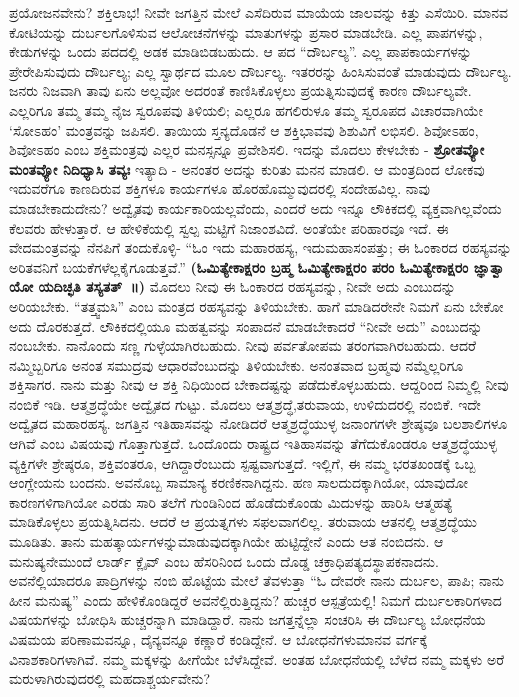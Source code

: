 ಪ್ರಯೋಜನವೇನು? ಶಕ್ತಿಲಾಭ! ನೀವೇ ಜಗತ್ತಿನ ಮೇಲೆ ಎಸೆದಿರುವ ಮಾಯೆಯ ಜಾಲವನ್ನು ಕಿತ್ತು ಎಸೆಯಿರಿ. ಮಾನವ ಕೋಟಿಯನ್ನು ದುರ್ಬಲಗೊಳಿಸುವ ಆಲೋಚನೆಗಳನ್ನು ಮಾತುಗಳನ್ನು ಪ್ರಸಾರ ಮಾಡಬೇಡಿ. ಎಲ್ಲ ಪಾಪಗಳನ್ನು, ಕೇಡುಗಳನ್ನು ಒಂದು ಪದದಲ್ಲಿ ಅಡಕ ಮಾಡಿಬಿಡಬಹುದು. ಆ ಪದ “ದೌರ್ಬಲ್ಯ”. ಎಲ್ಲ ಪಾಪಕಾರ್ಯಗಳನ್ನು ಪ್ರೇರೇಪಿಸುವುದು ದೌರ್ಬಲ್ಯ; ಎಲ್ಲ ಸ್ವಾರ್ಥದ ಮೂಲ ದೌರ್ಬಲ್ಯ. ಇತರರನ್ನು ಹಿಂಸಿಸುವಂತೆ ಮಾಡುವುದು ದೌರ್ಬಲ್ಯ. ಜನರು ನಿಜವಾಗಿ ತಾವು ಏನು ಅಲ್ಲವೋ ಅದರಂತೆ ಕಾಣಿಸಿಕೊಳ್ಳಲು ಪ್ರಯತ್ನಿಸುವುದಕ್ಕೆ ಕಾರಣ ದೌರ್ಬಲ್ಯವೇ. ಎಲ್ಲರಿಗೂ ತಮ್ಮ ತಮ್ಮ ನೈಜ ಸ್ವರೂಪವು ತಿಳಿಯಲಿ; ಎಲ್ಲರೂ ಹಗಲಿರುಳೂ ತಮ್ಮ ಸ್ವರೂಪದ ವಿಚಾರವಾಗಿಯೇ ‘ಸೋಽಹಂ’ ಮಂತ್ರವನ್ನು ಜಪಿಸಲಿ. ತಾಯಿಯ ಸ್ತನ್ಯದೊಡನೆ ಆ ಶಕ್ತಿಭಾವವು ಶಿಶುವಿಗೆ ಲಭಿಸಲಿ. ಶಿವೋಽಹಂ, ಶಿವೋಽಹಂ ಎಂಬ ಶಕ್ತಿಮಂತ್ರವು ಎಲ್ಲರ ಮನಸ್ಸನ್ನೂ ಪ್ರವೇಶಿಸಲಿ. ಇದನ್ನು ಮೊದಲು ಕೇಳಬೇಕು - \textbf{ಶ್ರೋತವ್ಯೋ ಮಂತವ್ಯೋ ನಿದಿಧ್ಯಾಸಿ ತವ್ಯಃ} ಇತ್ಯಾದಿ - ಅನಂತರ ಅದನ್ನು ಕುರಿತು ಮನನ ಮಾಡಲಿ. ಆ ಮಂತ್ರದಿಂದ ಲೋಕವು ಇದುವರೆಗೂ ಕಾಣದಿರುವ ಶಕ್ತಿಗಳೂ ಕಾರ್ಯಗಳೂ ಹೊರಹೊಮ್ಮುವುದರಲ್ಲಿ ಸಂದೇಹವಿಲ್ಲ. ನಾವು ಮಾಡಬೇಕಾದುದೇನು? ಅದ್ವೈತವು ಕಾರ್ಯಕಾರಿಯಲ್ಲವೆಂದು, ಎಂದರೆ ಅದು ಇನ್ನೂ ಲೌಕಿಕದಲ್ಲಿ ವ್ಯಕ್ತವಾಗಿಲ್ಲವೆಂದು ಕೆಲವರು ಹೇಳುತ್ತಾರೆ. ಆ ಹೇಳಿಕೆಯಲ್ಲಿ ಸ್ವಲ್ಪ ಮಟ್ಟಿಗೆ ನಿಜಾಂಶವಿದೆ. ಅಂತೆಯೇ ಪರಿಹಾರವೂ ಇದೆ. ಈ ವೇದಮಂತ್ರವನ್ನು ನೆನಪಿಗೆ ತಂದುಕೊಳ್ಳಿ- “ಓಂ ಇದು ಮಹಾರಹಸ್ಯ, ಇದು\break ಮಹಾಸಂಪತ್ತು; ಈ ಓಂಕಾರದ ರಹಸ್ಯವನ್ನು ಅರಿತವನಿಗೆ ಬಯಕೆಗಳೆಲ್ಲ\break ಕೈಗೂಡುತ್ತವೆ.” \textbf{(ಓಮಿತ್ಯೇಕಾಕ್ಷರಂ ಬ್ರಹ್ಮ ಓಮಿತ್ಯೇಕಾಕ್ಷರಂ ಪರಂ ಓಮಿತ್ಯೇ\-ಕಾಕ್ಷರಂ ಜ್ಞಾತ್ವಾ ಯೋ ಯದಿಚ್ಛತಿ ತಸ್ಯತತ್​~॥)} ಮೊದಲು ನೀವು ಈ ಓಂಕಾರದ ರಹಸ್ಯವನ್ನು, ನೀವೇ ಅದು ಎಂಬುದನ್ನು ಅರಿಯಬೇಕು. “ತತ್ತ್ವಮಸಿ” ಎಂಬ ಮಂತ್ರದ ರಹಸ್ಯವನ್ನು ತಿಳಿಯಬೇಕು. ಹಾಗೆ ಮಾಡಿದರೇನೇ ನಿಮಗೆ ಏನು ಬೇಕೋ ಅದು ದೊರಕುತ್ತದೆ. ಲೌಕಿಕದಲ್ಲಿಯೂ ಮಹತ್ವವನ್ನು ಸಂಪಾದನೆ ಮಾಡಬೇಕಾದರೆ “ನೀವೇ ಅದು” ಎಂಬುದನ್ನು ನಂಬಬೇಕು. ನಾನೊಂದು ಸಣ್ಣ ಗುಳ್ಳೆಯಾಗಿರಬಹುದು. ನೀವು ಪರ್ವತೋಪಮ ತರಂಗವಾಗಿರಬಹುದು. ಆದರೆ ನಮ್ಮಿಬ್ಬರಿಗೂ ಅನಂತ ಸಮುದ್ರವು ಆಧಾರವೆಂಬುದನ್ನು ತಿಳಿಯಬೇಕು. ಅನಂತವಾದ ಬ್ರಹ್ಮವು ನಮ್ಮೆಲ್ಲರಿಗೂ ಶಕ್ತಿಸಾಗರ. ನಾನು ಮತ್ತು ನೀವು ಆ ಶಕ್ತಿ ನಿಧಿಯಿಂದ ಬೇಕಾದಷ್ಟನ್ನು ಪಡೆದುಕೊಳ್ಳಬಹುದು. ಆದ್ದರಿಂದ ನಿಮ್ಮಲ್ಲಿ ನೀವು ನಂಬಿಕೆ ಇಡಿ. ಆತ್ಮಶ್ರದ್ಧೆಯೇ ಅದ್ವೈತದ ಗುಟ್ಟು. ಮೊದಲು ಆತ್ಮಶ್ರದ್ಧೆ,\break ತರುವಾಯ, ಉಳಿದುದರಲ್ಲಿ ನಂಬಿಕೆ. ಇದೇ ಅದ್ವೈತದ ಮಹಾರಹಸ್ಯ. ಜಗತ್ತಿನ ಇತಿಹಾಸವನ್ನು ನೋಡಿದರೆ ಆತ್ಮಶ್ರದ್ಧೆಯುಳ್ಳ ಜನಾಂಗಗಳೇ ಶ್ರೇಷ್ಠವೂ ಬಲಶಾಲಿಗಳೂ ಆಗಿವೆ ಎಂಬ ವಿಷಯವು ಗೊತ್ತಾಗುತ್ತದೆ. ಒಂದೊಂದು ರಾಷ್ಟ್ರದ ಇತಿಹಾಸವನ್ನು ತೆಗೆದುಕೊಂಡರೂ ಆತ್ಮಶ್ರದ್ಧೆಯುಳ್ಳ ವ್ಯಕ್ತಿಗಳೇ ಶ್ರೇಷ್ಠರೂ, ಶಕ್ತಿವಂತರೂ, ಆಗಿದ್ದಾರೆಂಬುದು ಸ್ಪಷ್ಟವಾಗುತ್ತದೆ. ಇಲ್ಲಿಗೆ, ಈ ನಮ್ಮ ಭರತಖಂಡಕ್ಕೆ ಒಬ್ಬ ಆಂಗ್ಲೇಯನು ಬಂದನು. ಅವನೊಬ್ಬ ಸಾಮಾನ್ಯ ಕರಣಿಕನಾಗಿದ್ದನು. ಹಣ ಸಾಲದುದಕ್ಕಾಗಿಯೋ, ಯಾವುದೋ ಕಾರಣಗಳಿಗಾಗಿಯೋ ಎರಡು ಸಾರಿ ತಲೆಗೆ ಗುಂಡಿನಿಂದ ಹೊಡೆದುಕೊಂಡು ಮಿದುಳನ್ನು ಹಾರಿಸಿ ಆತ್ಮಹತ್ಯೆ ಮಾಡಿಕೊಳ್ಳಲು ಪ್ರಯತ್ನಿಸಿದನು. ಆದರೆ ಆ ಪ್ರಯತ್ನಗಳು ಸಫಲವಾಗಲಿಲ್ಲ. ತರುವಾಯ ಆತನಲ್ಲಿ ಆತ್ಮಶ್ರದ್ಧೆಯು ಮೂಡಿತು. ತಾನು ಮಹತ್ಕಾರ್ಯಗಳನ್ನು\break ಮಾಡುವುದಕ್ಕಾಗಿಯೇ ಹುಟ್ಟಿದ್ದೇನೆ ಎಂದು ಆತ ನಂಬಿದನು. ಆ ಮನುಷ್ಯನೇ\break ಮುಂದೆ ಲಾರ್ಡ್​ ಕ್ಲೈವ್​ ಎಂಬ ಹೆಸರಿನಿಂದ ಒಂದು ದೊಡ್ಡ ಚಕ್ರಾಧಿಪತ್ಯದ\break ಸ್ಥಾಪಕನಾದನು. ಅವನೆಲ್ಲಿಯಾದರೂ ಪಾದ್ರಿಗಳನ್ನು ನಂಬಿ ಹೊಟ್ಟೆಯ ಮೇಲೆ ತೆವಳುತ್ತಾ “ಓ ದೇವರೇ ನಾನು ದುರ್ಬಲ, ಪಾಪಿ; ನಾನು ಹೀನ ಮನುಷ್ಯ” ಎಂದು ಹೇಳಿಕೊಂಡಿದ್ದರೆ ಅವನೆಲ್ಲಿರುತ್ತಿದ್ದನು? ಹುಚ್ಚರ ಆಸ್ಪತ್ರೆಯಲ್ಲಿ! ನಿಮಗೆ ದುರ್ಬಲಕಾರಿಗಳಾದ ವಿಷಯಗಳನ್ನು ಬೋಧಿಸಿ ಹುಚ್ಚರನ್ನಾಗಿ ಮಾಡಿದ್ದಾರೆ. ನಾನು ಜಗತ್ತನ್ನೆಲ್ಲಾ ಸಂಚರಿಸಿ ಈ ದೌರ್ಬಲ್ಯ ಬೋಧನೆಯ ವಿಷಮಯ ಪರಿಣಾಮವನ್ನೂ, ದೈನ್ಯವನ್ನೂ ಕಣ್ಣಾರೆ ಕಂಡಿದ್ದೇನೆ. ಆ ಬೋಧನೆಗಳು\break ಮಾನವ ವರ್ಗಕ್ಕೆ ವಿನಾಶಕಾರಿಗಳಾಗಿವೆ. ನಮ್ಮ ಮಕ್ಕಳನ್ನು ಹೀಗೆಯೇ ಬೆಳೆಸಿ\-ದ್ದೇವೆ. ಅಂತಹ ಬೋಧನೆಯಲ್ಲಿ ಬೆಳೆದ ನಮ್ಮ ಮಕ್ಕಳು ಅರೆ ಮರುಳಾಗಿರುವುದರಲ್ಲಿ ಮಹದಾಶ್ಚರ್ಯವೇನು?

